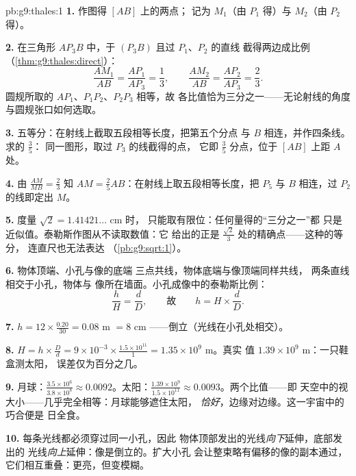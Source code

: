 \begin{solution}{pb:g9:thales:1}
\textbf{1.} 作图得 $[AB]$ 上的两点；
记为 $M_1$（由 $P_1$ 得）与 $M_2$（由 $P_2$ 得）。

\textbf{2.} 在三角形 $A P_3 B$ 中，于 $(P_3 B)$ 且过 $P_1$、$P_2$ 的直线
截得两边成比例
（\cref{thm:g9:thales:direct}）：
\[
\frac{A M_1}{AB} = \frac{A P_1}{A P_3} = \frac13,
\qquad
\frac{A M_2}{AB} = \frac{A P_2}{A P_3} = \frac23 .
\]
圆规所取的 $A P_1$、$P_1 P_2$、$P_2 P_3$ 相等，故
各比值恰为三分之一——无论射线的角度
与圆规张口如何选取。

\textbf{3.} 五等分：在射线上截取五段相等长度，把第五个分点
与 $B$ 相连，并作四条线。求的 $\frac35$：
同一图形，取过 $P_3$ 的线截得的点，
它即 $\frac{3}{5}$ 分点，位于 $[AB]$ 上距 $A$ 处。

\textbf{4.} 由 $\frac{AM}{MB} = \frac23$ 知
$AM = \frac25 AB$：在射线上取五段相等长度，把 $P_5$ 与
$B$ 相连，过 $P_2$ 的线即定出 $M$。

\textbf{5.} 度量 $\sqrt2 = 1.41421\ldots$ cm 时，
只能取有限位：任何量得的“三分之一”都
只是近似值。泰勒斯作图从不读取数值：它
给出的正是 $\frac{\sqrt2}{3}$ 处的精确点——这种的等分，
连直尺也无法表达
（\cref{pb:g9:sqrt:1}）。

\textbf{6.} 物体顶端、小孔与像的底端
三点共线，物体底端与像顶端同样共线，
两条直线相交于小孔，物体与
像所在墙面。小孔成像中的泰勒斯比例：
\[
\frac{h}{H} = \frac{d}{D},
\qquad\text{故}\qquad
h = H \times \frac dD .
\]

\textbf{7.} $h = 12 \times \frac{0.20}{30} = 0.08$ m $= 8$ cm
——倒立（光线在小孔处相交）。

\textbf{8.} $H = h \times \frac Dd = 9 \times 10^{-3} \times
\frac{1.5 \times 10^{11}}{1} = 1.35 \times 10^{9}$ m。真实
值 $1.39 \times 10^9$ m：一只鞋盒测太阳，
误差仅为百分之几。

\textbf{9.} 月球：$\frac{3.5 \times 10^6}{3.8 \times 10^8}
\approx 0.0092$。太阳：$\frac{1.39 \times 10^9}{1.5 \times
10^{11}} \approx 0.0093$。两个比值——即
天空中的视大小——几乎完全相等：月球能够遮住太阳，
\emph{恰好}，边缘对边缘。这一宇宙中的巧合便是
日全食。

\textbf{10.} 每条光线都必须穿过同一小孔，因此
物体顶部发出的光线\emph{向下}延伸，底部发出的
光线\emph{向上}延伸：像是倒立的。扩大小孔
会让整束略有偏移的像的副本通过，
它们相互重叠：更亮，但变模糊。


\end{solution}
